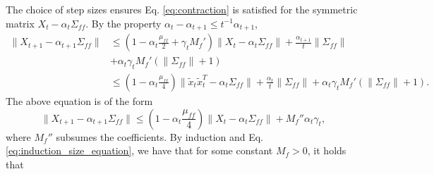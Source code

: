 The choice of step sizes ensures Eq. \eqref{eq:contraction} is satisfied for the symmetric matrix $X_t - \alpha_t \Sigma_{ff}$.
By the property $\alpha_t - \alpha_{t+1} \leq t^{-1} \alpha_{t+1}$, 
\begin{align*}
    \lVert X_{t+1} - \alpha_{t+1} \Sigma_{ff}\rVert 
    & \leq \left(1 - \alpha_t \frac{\mu_{ff}}{2} + \gamma_t M_f'\right) \lVert X_t - \alpha_t \Sigma_{ff} \rVert 
    + \frac{\alpha_{t+1}}{t} \lVert \Sigma_{ff} \rVert
    \\ & 
    + \alpha_t \gamma_t  M_f' (\lVert \Sigma_{ff}  \rVert + 1)
    \\ 
    & 
    \leq 
    \left(1 - \alpha_t \frac{\mu_{ff}}{4}\right) \lVert \tilde{x}_t \tilde{x}_t^T - \alpha_t \Sigma_{ff}\rVert 
    + \frac{\alpha_t}{t} \lVert \Sigma_{ff} \rVert + \alpha_t \gamma_t M_f' (\lVert \Sigma_{ff}  \rVert + 1)
    .
\end{align*}
The above equation is of the form
\begin{equation}
    \lVert X_{t+1} - \alpha_{t+1} \Sigma_{ff} \rVert \leq \left(1 - \alpha_t \frac{\mu_{ff}}{4}\right) \lVert X_t - \alpha_t \Sigma_{ff} \rVert
    + M_f'' \alpha_t \gamma_t ,
\end{equation}
where $M_f''$ subsumes the coefficients. 
By induction and Eq. \eqref{eq:induction_size_equation}, we have that for some constant $M_f > 0$, it holds that
